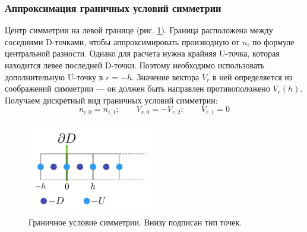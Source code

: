 \subsubsection*{Аппроксимация граничных условий симметрии} 
Центр симметрии на левой границе (рис. \ref{fig:dhd_symmetry}). Граница расположена между соседними D-точками, чтобы аппроксимировать производную от $n_i$ по формуле центральной разности. Однако для расчета нужна крайняя U-точка, которая находится левее последней D-точки. Поэтому необходимо использовать дополнительную U-точку в $r = -h$. Значение вектора $V_r$ в ней определяется из соображений симметрии --- он должен быть направлен противоположено $V_r(h)$. Получаем дискретный вид граничных условий симметрии:
\begin{equation}
n_{i, 0} = n_{i, 1};
\quad \quad
V_{r, 0} = -V_{r, 2};
\quad \quad
V_{r, 1} = 0
\end{equation}
\begin{figure}[H]
\centering
\includegraphics[width=0.5\textwidth]{common_images/symmetry.jpg}
\caption{Граничное условие симметрии. Внизу подписан тип точек.}
\label{fig:dhd_symmetry}
\end{figure}

